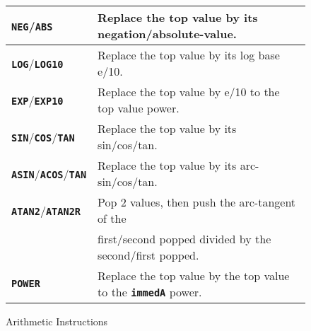 \documentclass[12pt]{article}
\newcommand{\TT}[1]{{\tt \bfseries #1}}
\newlength{\figurewidth}
\newenvironment{boxedfigure}[1][!btp]%
	{\begin{figure*}[#1]
	 \begin{lrbox}{\figurebox}
	 \begin{minipage}{\figurewidth}

	 \vspace*{1ex}}%
	{
	 \vspace*{1ex}

	 \end{minipage}
	 \end{lrbox}

	 \centering
	 \fbox{\hspace*{0.1in}\usebox{\figurebox}\hspace*{0.1in}}
	 \end{figure*}}
\begin{document}
\begin{boxedfigure}
\begin{center}
\begin{tabular}{|l|l|}
\\\hline
\TT{NEG}/\TT{ABS}
    & Replace the top value by its negation/absolute-value.
\\\hline
\TT{LOG}/\TT{LOG10}
    & Replace the top value by its log base e/10.
\\\hline
\TT{EXP}/\TT{EXP10}
    & Replace the top value by e/10 to the top value power.
\\\hline
\TT{SIN}/\TT{COS}/\TT{TAN}
    & Replace the top value by its sin/cos/tan.
\\\hline
\TT{ASIN}/\TT{ACOS}/\TT{TAN}
    & Replace the top value by its arc- sin/cos/tan.
\\\hline
\TT{ATAN2}/\TT{ATAN2R}
    & Pop 2 values, then push the arc-tangent of the \\
    & first/second popped divided by the second/first popped.
\\\hline
\TT{POWER}
    & Replace the top value by the top value to the \TT{immedA} power.
\\\hline
\end{tabular}
\end{center}
\caption{Arithmetic Instructions}
\label{ARITHMETIC-INSTRUCTIONS}
\end{boxedfigure}
\end{document}
